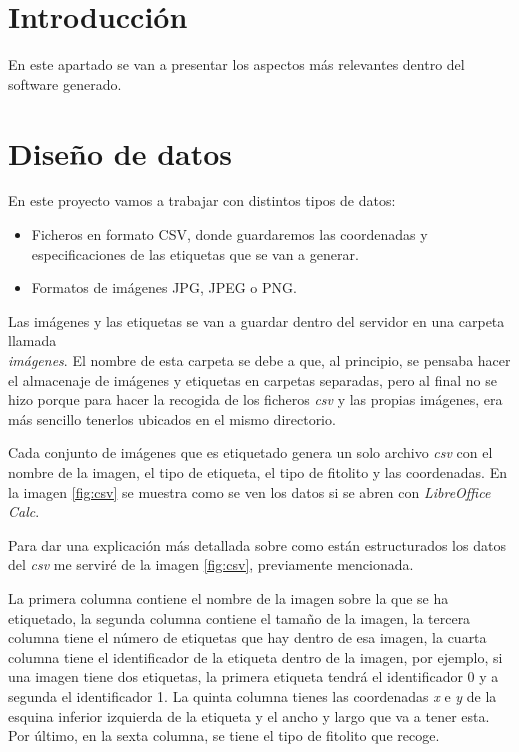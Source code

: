 
\section{Introducción}
En este apartado se van a presentar los aspectos más relevantes dentro del software generado.

\section{Diseño de datos}
En este proyecto vamos a trabajar con distintos tipos de datos:
\begin{itemize}
	\item Ficheros en formato CSV, donde guardaremos las coordenadas y especificaciones de las etiquetas que se van a generar.
	\item Formatos de imágenes JPG, JPEG o PNG.
\end{itemize}

Las imágenes y las etiquetas se van a guardar dentro del servidor en una carpeta llamada\textit{\\imágenes}. El nombre de esta carpeta se debe a que, al principio, se pensaba hacer el almacenaje de imágenes y etiquetas en carpetas separadas, pero al final no se hizo porque para hacer la recogida de los ficheros \textit{csv} y las propias imágenes, era más sencillo tenerlos ubicados en el mismo directorio.

Cada conjunto de imágenes que es etiquetado genera un solo archivo \textit{csv} con el nombre de la imagen, el tipo de etiqueta, el tipo de fitolito y las coordenadas. En la imagen \ref{fig:csv} se muestra como se ven los datos si se abren con \textit{LibreOffice Calc}.

Para dar una explicación más detallada sobre como están estructurados los datos del \textit{csv} me serviré de la imagen \ref{fig:csv}, previamente mencionada.

La primera columna contiene el nombre de la imagen sobre la que se ha etiquetado, la segunda columna contiene el tamaño de la imagen, la tercera columna tiene el número de etiquetas que hay dentro de esa imagen, la cuarta columna tiene el identificador de la etiqueta dentro de la imagen, por ejemplo, si una imagen tiene dos etiquetas, la primera etiqueta tendrá el identificador 0 y a segunda el identificador 1. La quinta columna tienes las coordenadas \textit{x} e \textit{y} de la esquina inferior izquierda de la etiqueta y el ancho y largo que va a tener esta. Por último, en la sexta columna, se tiene el tipo de fitolito que recoge.
